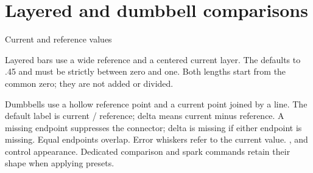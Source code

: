 \section{Layered and dumbbell comparisons}
\begin{demo}{Current and reference values}



\end{demo}
Layered bars use a wide reference and a centered current layer. The
 defaults to .45 and must be strictly between zero and one.
Both lengths start from the common zero; they are not added or divided.

Dumbbells use a hollow reference point and a current point joined by a line.
The default label is current / reference; delta means current minus reference.
A missing endpoint suppresses the connector; delta is missing if either endpoint
is missing. Equal endpoints overlap. Error whiskers refer to the current value.
,  and  control appearance.
Dedicated comparison and spark commands retain their shape when applying presets.
